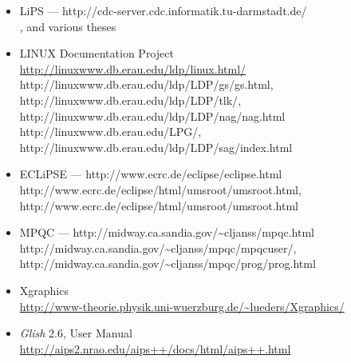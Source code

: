 \begin{description}
\begin{itemize}
\item 
LiPS --- 
{http://cdc-server.cdc.informatik.tu-darmstadt.de/}\\
, 
and various theses
\html{\smallskip}%

\item
LINUX Documentation Project\\
\url{http://linuxwww.db.erau.edu/ldp/linux.html/}\\
%
{http://linuxwww.db.erau.edu/ldp/LDP/gs/gs.html}, 
%
{http://linuxwww.db.erau.edu/ldp/LDP/tlk/}, 
%
{http://linuxwww.db.erau.edu/ldp/LDP/nag/nag.html}\\
%
{http://linuxwww.db.erau.edu/LPG/}, 
%
{http://linuxwww.db.erau.edu/ldp/LDP/sag/index.html}
\html{\smallskip}%

\item
ECLiPSE --- %
{http://www.ecrc.de/eclipse/eclipse.html}\\
%
{http://www.ecrc.de/eclipse/html/umsroot/umsroot.html}, 
%
{http://www.ecrc.de/eclipse/html/umsroot/umsroot.html}
\html{\smallskip}%

\item
MPQC --- 
{http://midway.ca.sandia.gov/\~{}cljanss/mpqc.html}\\
%
{http://midway.ca.sandia.gov/\~{}cljanss/mpqc/mpqcuser/}, 
%
{http://midway.ca.sandia.gov/\~{}cljanss/mpqc/prog/prog.html}
\html{\smallskip}%

\item
Xgraphics\\
\url{http://www-theorie.physik.uni-wuerzburg.de/~lueders/Xgraphics/}
\html{\smallskip}%

\item
\textit{Glish} 2.6, User Manual\\
\url{http://aips2.nrao.edu/aips++/docs/html/aips++.html}
\html{\smallskip}%


\end{itemize}
\end{description}
